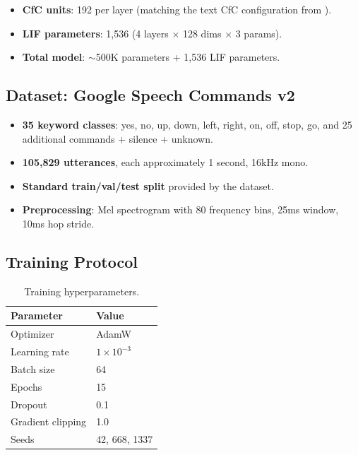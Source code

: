 \documentclass[11pt]{article}
\begin{document}
\begin{itemize}
    \item \textbf{CfC units}: 192 per layer (matching the text CfC configuration from \cite{tsubasa2026lif}).
    \item \textbf{LIF parameters}: 1{,}536 (4 layers $\times$ 128 dims $\times$ 3 params).
    \item \textbf{Total model}: $\sim$500K parameters + 1{,}536 LIF parameters.
\end{itemize}

\subsection{Dataset: Google Speech Commands v2}

\begin{itemize}
    \item \textbf{35 keyword classes}: yes, no, up, down, left, right, on, off, stop, go, and 25 additional commands + silence + unknown.
    \item \textbf{105{,}829 utterances}, each approximately 1 second, 16kHz mono.
    \item \textbf{Standard train/val/test split} provided by the dataset.
    \item \textbf{Preprocessing}: Mel spectrogram with 80 frequency bins, 25ms window, 10ms hop stride.
\end{itemize}

\subsection{Training Protocol}

\begin{table}[h]
\centering
\caption{Training hyperparameters.}
\label{tab:training}
\begin{tabular}{ll}
\toprule
\textbf{Parameter} & \textbf{Value} \\
\midrule
Optimizer & AdamW \\
Learning rate & $1 \times 10^{-3}$ \\
Batch size & 64 \\
Epochs & 15 \\
Dropout & 0.1 \\
Gradient clipping & 1.0 \\
Seeds & 42, 668, 1337 \\
\bottomrule
\end{tabular}
\end{table}
\end{document}
